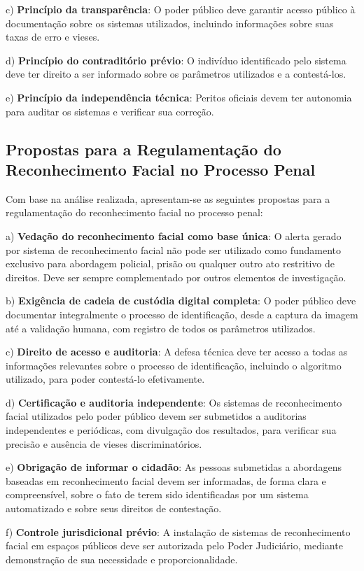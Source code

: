 \documentclass[12pt,a4paper]{article}
\begin{document}
c) \textbf{Princípio da transparência}: O poder público deve garantir acesso público à documentação sobre os sistemas utilizados, incluindo informações sobre suas taxas de erro e vieses.

d) \textbf{Princípio do contraditório prévio}: O indivíduo identificado pelo sistema deve ter direito a ser informado sobre os parâmetros utilizados e a contestá-los.

e) \textbf{Princípio da independência técnica}: Peritos oficiais devem ter autonomia para auditar os sistemas e verificar sua correção.

\subsection{Propostas para a Regulamentação do Reconhecimento Facial no Processo Penal}

Com base na análise realizada, apresentam-se as seguintes propostas para a regulamentação do reconhecimento facial no processo penal:

a) \textbf{Vedação do reconhecimento facial como base única}: O alerta gerado por sistema de reconhecimento facial não pode ser utilizado como fundamento exclusivo para abordagem policial, prisão ou qualquer outro ato restritivo de direitos. Deve ser sempre complementado por outros elementos de investigação.

b) \textbf{Exigência de cadeia de custódia digital completa}: O poder público deve documentar integralmente o processo de identificação, desde a captura da imagem até a validação humana, com registro de todos os parâmetros utilizados.

c) \textbf{Direito de acesso e auditoria}: A defesa técnica deve ter acesso a todas as informações relevantes sobre o processo de identificação, incluindo o algoritmo utilizado, para poder contestá-lo efetivamente.

d) \textbf{Certificação e auditoria independente}: Os sistemas de reconhecimento facial utilizados pelo poder público devem ser submetidos a auditorias independentes e periódicas, com divulgação dos resultados, para verificar sua precisão e ausência de vieses discriminatórios.

e) \textbf{Obrigação de informar o cidadão}: As pessoas submetidas a abordagens baseadas em reconhecimento facial devem ser informadas, de forma clara e compreensível, sobre o fato de terem sido identificadas por um sistema automatizado e sobre seus direitos de contestação.

f) \textbf{Controle jurisdicional prévio}: A instalação de sistemas de reconhecimento facial em espaços públicos deve ser autorizada pelo Poder Judiciário, mediante demonstração de sua necessidade e proporcionalidade.
\end{document}
